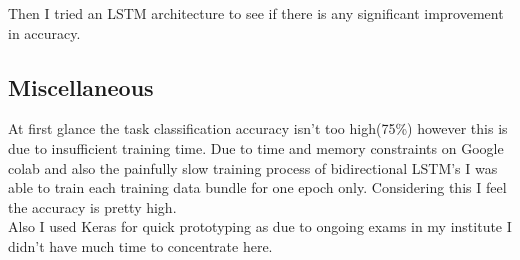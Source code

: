 \documentclass{article}
\begin{document}
Then I tried an LSTM architecture to see if there is any significant improvement in accuracy.

\subsection*{Miscellaneous}
At first glance the task classification accuracy isn't too high(75\%) however this is due to insufficient training time.
Due to time and memory constraints on Google colab and also the painfully slow training process of bidirectional LSTM's I was able to train each training data bundle for one epoch only. Considering this I feel the accuracy is pretty high.
\\
Also I used Keras for quick prototyping as due to ongoing exams in my institute I didn't have much time to concentrate here.
\end{document}
